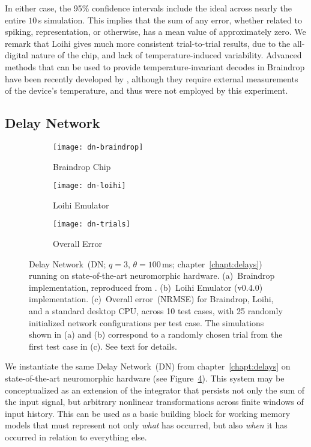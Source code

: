 In either case, the 95\% confidence intervals include the ideal across nearly the entire $10$\,s simulation.
This implies that the sum of any error, whether related to spiking, representation, or otherwise, has a mean value of approximately zero.
We remark that Loihi gives much more consistent trial-to-trial results, due to the all-digital nature of the chip, and lack of temperature-induced variability.
Advanced methods that can be used to provide temperature-invariant decodes in Braindrop have been recently developed by \citet{reidpint2019}, although they require external measurements of the device's temperature, and thus were not employed by this experiment.

\subsection{Delay Network}

\begin{figure}
  \centering
  \begin{subfigure}{.5\textwidth}
    \centering
    \texttt{[image: dn-braindrop]}
    \caption{Braindrop Chip}
    \label{fig:dn-braindrop}
  \end{subfigure}%
  \begin{subfigure}{.5\textwidth}
    \centering
    \texttt{[image: dn-loihi]}
    \caption{Loihi Emulator}
    \label{fig:dn-loihi}
  \end{subfigure}
  \begin{subfigure}{\textwidth}
    \centering
    \vspace{2em}
    \texttt{[image: dn-trials]}
    \caption{Overall Error}
    \label{fig:dn-trials}
  \end{subfigure}
  \caption{ \label{fig:dn-neuromorphic}
    Delay Network~(DN; $q=3$, $\theta=100$\,ms; chapter~\ref{chapt:delays}) running on state-of-the-art neuromorphic hardware.
    (a)~Braindrop implementation, reproduced from \citet[][Figure~16]{braindrop2019}. 
    (b)~Loihi Emulator (v0.4.0) implementation.
    (c)~Overall error~(NRMSE) for Braindrop, Loihi, and a standard desktop CPU, across 10 test cases, with 25 randomly initialized network configurations per test case.
    The simulations shown in (a) and (b) correspond to a randomly chosen trial from the first test case in (c).
    See text for details.
  }
\end{figure}


We instantiate the same Delay Network~(DN) from chapter~\ref{chapt:delays} on state-of-the-art neuromorphic hardware (see Figure~\ref{fig:dn-neuromorphic}).
This system may be conceptualized as an extension of the integrator that persists not only the sum of the input signal, but arbitrary nonlinear transformations across finite windows of input history.
This can be used as a basic building block for working memory models that must represent not only \emph{what} has occurred, but also \emph{when} it has occurred in relation to everything else.

